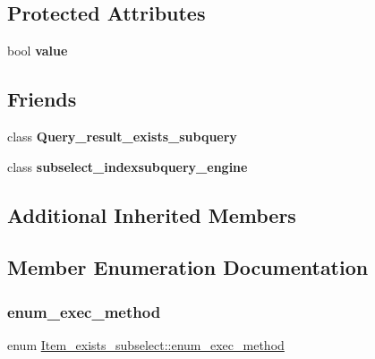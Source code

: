 \subsection*{Protected Attributes}
\begin{DoxyCompactItemize}
\item 
\mbox{\label{classItem__exists__subselect_a7f0af4863924fe44cf9dbf9d47764f0f}} 
bool {\bfseries value}
\end{DoxyCompactItemize}
\subsection*{Friends}
\begin{DoxyCompactItemize}
\item 
\mbox{\label{classItem__exists__subselect_ae34bd6c29f4eb9bd5657130b387fe173}} 
class {\bfseries Query\+\_\+result\+\_\+exists\+\_\+subquery}
\item 
\mbox{\label{classItem__exists__subselect_ab4ad88114d3bced9f04b989f73b27711}} 
class {\bfseries subselect\+\_\+indexsubquery\+\_\+engine}
\end{DoxyCompactItemize}
\subsection*{Additional Inherited Members}


\subsection{Member Enumeration Documentation}
\mbox{\label{classItem__exists__subselect_aa110ca13dba0d9c620f5f72e6bad798e}} 
\subsubsection{\texorpdfstring{enum\+\_\+exec\+\_\+method}{enum\_exec\_method}}
{\footnotesize\ttfamily enum \mbox{\hyperlink{classItem__exists__subselect_aa110ca13dba0d9c620f5f72e6bad798e}{Item\+\_\+exists\+\_\+subselect\+::enum\+\_\+exec\+\_\+method}}}

